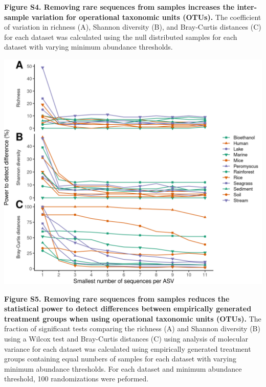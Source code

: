 \documentclass[
]{article}
\begin{document}
\textbf{Figure S4. Removing rare sequences from samples increases the
inter-sample variation for operational taxonomic units (OTUs).} The
coefficient of variation in richness (A), Shannon diversity (B), and
Bray-Curtis distances (C) for each dataset was calculated using the null
distributed samples for each dataset with varying minimum abundance
thresholds.

\newpage

\includegraphics{figure_s5.png}

\textbf{Figure S5. Removing rare sequences from samples reduces the
statistical power to detect differences between empirically generated
treatment groups when using operational taxonomic units (OTUs).} The
fraction of significant tests comparing the richness (A) and Shannon
diversity (B) using a Wilcox test and Bray-Curtis distances (C) using
analysis of molecular variance for each dataset was calculated using
empirically generated treatment groups containing equal numbers of
samples for each dataset with varying minimum abundance thresholds. For
each dataset and minimum abundance threshold, 100 randomizations were
peformed.

\newpage
\end{document}
